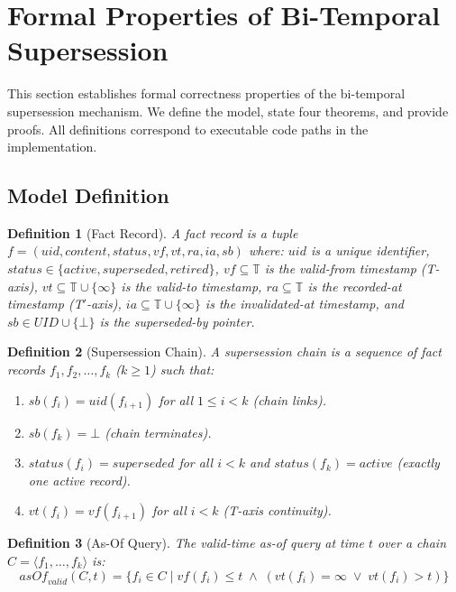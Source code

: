 \documentclass{article}
\newtheorem{definition}{Definition}
\begin{document}
\section{Formal Properties of Bi-Temporal Supersession}
\label{sec:formal}

This section establishes formal correctness properties of the bi-temporal supersession mechanism. We define the model, state four theorems, and provide proofs. All definitions correspond to executable code paths in the implementation.

\subsection{Model Definition}

\begin{definition}[Fact Record]
A \emph{fact record} is a tuple $f = (\mathit{uid}, \mathit{content}, \mathit{status}, \mathit{vf}, \mathit{vt}, \mathit{ra}, \mathit{ia}, \mathit{sb})$ where:
$\mathit{uid}$ is a unique identifier, $\mathit{status} \in \{\mathit{active}, \mathit{superseded}, \mathit{retired}\}$, $\mathit{vf} \subseteq \mathbb{T}$ is the \emph{valid-from} timestamp (T-axis), $\mathit{vt} \subseteq \mathbb{T} \cup \{\infty\}$ is the \emph{valid-to} timestamp, $\mathit{ra} \subseteq \mathbb{T}$ is the \emph{recorded-at} timestamp (T$'$-axis), $\mathit{ia} \subseteq \mathbb{T} \cup \{\infty\}$ is the \emph{invalidated-at} timestamp, and $\mathit{sb} \in \mathit{UID} \cup \{\bot\}$ is the \emph{superseded-by} pointer.
\end{definition}

\begin{definition}[Supersession Chain]
A \emph{supersession chain} is a sequence of fact records $f_1, f_2, \ldots, f_k$ ($k \geq 1$) such that:
\begin{enumerate}
\item $\mathit{sb}(f_i) = \mathit{uid}(f_{i+1})$ for all $1 \leq i < k$ (chain links).
\item $\mathit{sb}(f_k) = \bot$ (chain terminates).
\item $\mathit{status}(f_i) = \mathit{superseded}$ for all $i < k$ and $\mathit{status}(f_k) = \mathit{active}$ (exactly one active record).
\item $\mathit{vt}(f_i) = \mathit{vf}(f_{i+1})$ for all $i < k$ (T-axis continuity).
\end{enumerate}
\end{definition}

\begin{definition}[As-Of Query]
The \emph{valid-time as-of query} at time $t$ over a chain $C = \langle f_1, \ldots, f_k \rangle$ is:
\[
\mathit{asOf}_{\mathit{valid}}(C, t) = \{f_i \in C \mid \mathit{vf}(f_i) \leq t \;\wedge\; (\mathit{vt}(f_i) = \infty \;\vee\; \mathit{vt}(f_i) > t)\}
\]
\end{definition}
\end{document}
